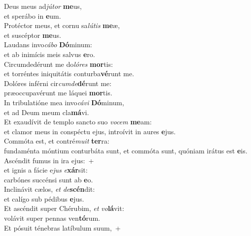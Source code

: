 \evenverse Deus meus ad\textit{jú}\textit{tor} \textbf{me}us,~\*\\
\evenverse et sperábo in \textbf{e}um.\\
\oddverse Protéctor meus, et cornu sa\textit{lú}\textit{tis} \textbf{me}æ,~\*\\
\oddverse et suscéptor \textbf{me}us.\\
\evenverse Laudans invo\textit{cá}\textit{bo} \textbf{Dó}minum:~\*\\
\evenverse et ab inimícis meis salvus \textbf{e}ro.\\
\oddverse Circumdedérunt me do\textit{ló}\textit{res} \textbf{mor}tis:~\*\\
\oddverse et torréntes iniquitátis conturba\textbf{vé}runt me.\\
\evenverse Dolóres inférni cir\textit{cum}\textit{de}\textbf{dé}runt me:~\*\\
\evenverse præoccupavérunt me láquei \textbf{mor}tis.\\
\oddverse In tribulatióne mea invo\textit{cá}\textit{vi} \textbf{Dó}minum,~\*\\
\oddverse et ad Deum meum cla\textbf{má}vi.\\
\evenverse Et exaudívit de templo sancto suo \textit{vo}\textit{cem} \textbf{me}am:~\*\\
\evenverse et clamor meus in conspéctu ejus, introívit in aures \textbf{e}jus.\\
\oddverse Commóta est, et contré\textit{mu}\textit{it} \textbf{ter}ra:~\*\\
\oddverse fundaménta móntium conturbáta sunt, et commóta sunt, quóniam irátus est \textbf{e}is.\\
\evenverse Ascéndit fumus in ira ejus:~+\\
\evenverse  et ignis a fácie e\textit{jus} \textit{e}\textbf{xár}sit:~\*\\
\evenverse carbónes succénsi sunt ab \textbf{e}o.\\
\oddverse Inclinávit cælos, \textit{et} \textit{de}\textbf{scén}dit:~\*\\
\oddverse et calígo sub pédibus \textbf{e}jus.\\
\evenverse Et ascéndit super Chérubim, \textit{et} \textit{vo}\textbf{lá}vit:~\*\\
\evenverse volávit super pennas ven\textbf{tó}rum.\\
\oddverse Et pósuit ténebras latíbulum suum,~+\\
